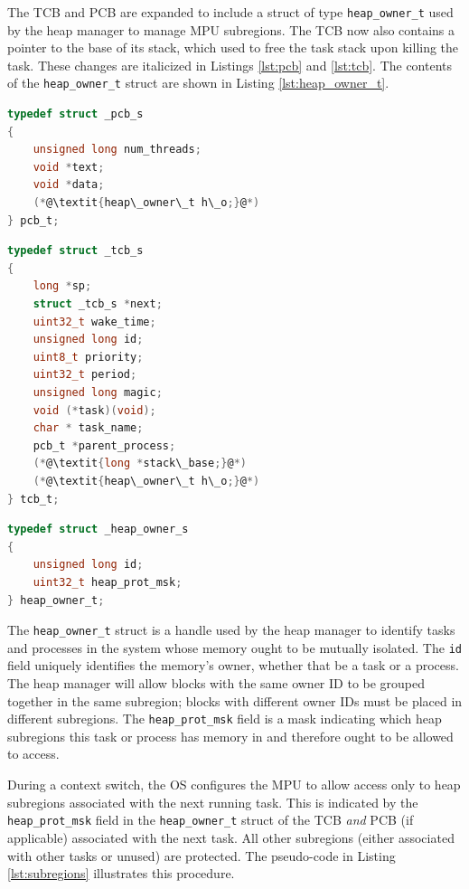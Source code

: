 The TCB and PCB are expanded to include a struct of type \texttt{heap\_owner\_t} used by the heap manager to manage MPU subregions. The TCB now also contains a pointer to the base of its stack, which used to free the task stack upon killing the task. These changes are italicized in Listings \ref{lst:pcb} and \ref{lst:tcb}. The contents of the \texttt{heap\_owner\_t} struct are shown in Listing \ref{lst:heap_owner_t}.
\begin{lstlisting}[language=c, caption={Process Control Block definition}, captionpos=b, label={lst:pcb}, float]
typedef struct _pcb_s
{
    unsigned long num_threads;
    void *text;
    void *data;
    (*@\textit{heap\_owner\_t h\_o;}@*)
} pcb_t;
\end{lstlisting}
\begin{lstlisting}[language=c, caption={Task Control Block definition}, captionpos=b, label={lst:tcb}, float]
typedef struct _tcb_s
{
    long *sp;
    struct _tcb_s *next;
    uint32_t wake_time;
    unsigned long id;
    uint8_t priority;
    uint32_t period;
    unsigned long magic;
    void (*task)(void);
    char * task_name;
    pcb_t *parent_process;
    (*@\textit{long *stack\_base;}@*)
    (*@\textit{heap\_owner\_t h\_o;}@*)
} tcb_t;
\end{lstlisting}
\begin{lstlisting}[language=c, caption={heap\_owner\_t struct definition}, captionpos=b, label={lst:heap_owner_t}, float]
typedef struct _heap_owner_s
{
    unsigned long id;
    uint32_t heap_prot_msk;
} heap_owner_t;
\end{lstlisting}

The \texttt{heap\_owner\_t} struct is a handle used by the heap manager to identify tasks and processes in the system whose memory ought to be mutually isolated. The \texttt{id} field uniquely identifies the memory's owner, whether that be a task or a process. The heap manager will allow blocks with the same owner ID to be grouped together in the same subregion; blocks with different owner IDs must be placed in different subregions. The \texttt{heap\_prot\_msk} field is a mask indicating which heap subregions this task or process has memory in and therefore ought to be allowed to access.

During a context switch, the OS configures the MPU to allow access only to heap subregions associated with the next running task. This is indicated by the \texttt{heap\_prot\_msk} field in the \texttt{heap\_owner\_t} struct of the TCB \textit{and} PCB (if applicable) associated with the next task. All other subregions (either associated with other tasks or unused) are protected. The pseudo-code in Listing \ref{lst:subregions} illustrates this procedure.

